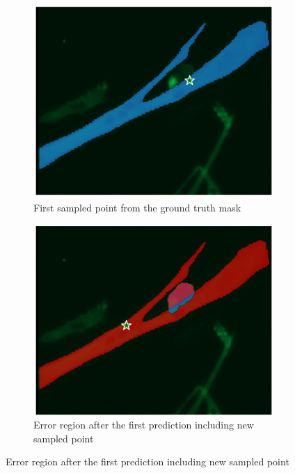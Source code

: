 \begin{figure}
	\centering
	\begin{subfigure}{0.45\textwidth}
		\centering
		\includegraphics[width=\linewidth]{images/training1}
		\caption{First sampled point from the ground truth mask}
		\label{figtrain1}
	\end{subfigure}
	\hfill
	\begin{subfigure}{0.45\textwidth}
		\centering
		\includegraphics[width=\linewidth]{images/training2}
		\caption{Error region after the first prediction including new sampled point}
		\label{figtrain2}
	\end{subfigure}
	

\end{figure}
